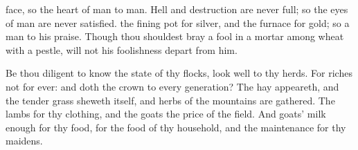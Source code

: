 {face, so the
heart of
man to
man.
Hell and
destruction are
never
full; so the
eyes of
man are never
satisfied.
 the fining
pot for
silver, and the
furnace for
gold; so
{} a
man
to his
praise.
Though thou shouldest
bray a
fool in a
mortar
among
wheat with a
pestle,
{} will not his
foolishness
depart from him.
\par }{\PP {}Be thou
diligent to
know the
state of thy
flocks,
{}
look
well to thy
herds.
For
riches
{} not for
ever: and doth the
crown
{} to
every
generation?
The
hay
appeareth, and the tender
grass
sheweth itself, and
herbs of the
mountains are
gathered.
The
lambs
{} for thy
clothing, and the
goats
{} the
price of the
field.
And
{}
goats’
milk
enough for thy
food, for the
food of thy
household, and
{} the
maintenance for thy
maidens.

}
